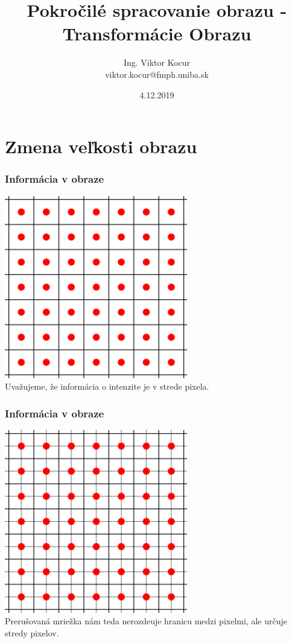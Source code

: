 \documentclass{beamer}
\title[11. cvičenie]{Pokročilé spracovanie obrazu - Transformácie Obrazu}
\author[Kocur]{Ing. Viktor Kocur \\{\small viktor.kocur@fmph.uniba.sk}}
\institute{DAI FMFI UK}
\date{4.12.2019}
\begin{document}

\begin{frame}

  \titlepage

\end{frame}

\section{Zmena veľkosti obrazu}


\begin{frame}
\frametitle{Informácia v obraze}
\centering
\includegraphics[width=0.6\textwidth]{resize1.png}\\

Uvažujeme, že informácia o intenzite je v strede pixela.
\end{frame}


\begin{frame}
\frametitle{Informácia v obraze}
\centering
\includegraphics[width=0.6\textwidth]{resize2.png} \\
Prerušovaná mriežka nám teda nerozdeuje hranicu medzi pixelmi, ale určuje stredy pixelov.
\end{frame}
\end{document}
